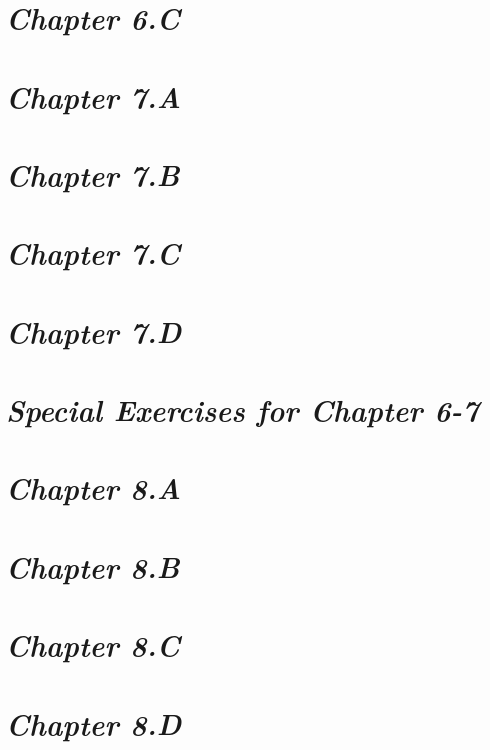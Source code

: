 \documentclass[a4paper,12pt]{article}
\begin{document}
    \newpage

    \section{\large \textit{Chapter 6.C}}

    

    \newpage

    \section{\large \textit{Chapter 7.A}}

    

    \newpage

    \section{\large \textit{Chapter 7.B}}

    

    \newpage

    \section{\large \textit{Chapter 7.C}}

    

    \newpage

    \section{\large \textit{Chapter 7.D}}

    

    \newpage

    \section{\large \textit{Special Exercises for Chapter 6-7}}

    

    \newpage

    \section{\large \textit{Chapter 8.A}}

    

    \newpage

    \section{\large \textit{Chapter 8.B}}

    

    \newpage

    \section{\large \textit{Chapter 8.C}}

    

    \newpage

    \section{\large \textit{Chapter 8.D}}

    
\end{document}
